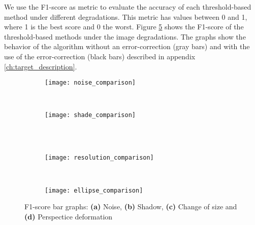 We use the F1-score as metric to evaluate the accuracy of each threshold-based method under different degradations. This metric has values between 0 and 1, where 1 is the best score and 0 the worst. Figure \ref{fig:degradations_graphs} shows the F1-score of the threshold-based methods under the image degradations. The graphs show the behavior of the algorithm without an error-correction (gray bars) and with the use of the error-correction (black bars) described in appendix \ref{ch:target_description}.
\begin{figure}[h!]
    \centering
    \begin{subfigure}[b]{0.4\textwidth}
        \texttt{[image: noise\_comparison]}
        \caption{}
        \label{fig:noise_graph}
    \end{subfigure}
        ~ %
    \begin{subfigure}[b]{0.4\textwidth}
        \texttt{[image: shade\_comparison]}
        \caption{}
        \label{fig:shadow_graph}
    \end{subfigure}\\
        ~ %
    \begin{subfigure}[b]{0.4\textwidth}
        \texttt{[image: resolution\_comparison]}
        \caption{}
        \label{fig:esolution_graph}
    \end{subfigure}
        ~ %
    \begin{subfigure}[b]{0.4\textwidth}
        \texttt{[image: ellipse\_comparison]}
        \caption{}
        \label{fig:deformation_graph}
    \end{subfigure}
    \caption{F1-score bar graphs: \textbf{(a)} Noise, \textbf{(b)} Shadow, \textbf{(c)} Change of size and \textbf{(d)} Perspectice deformation}\label{fig:degradations_graphs}
\end{figure}

